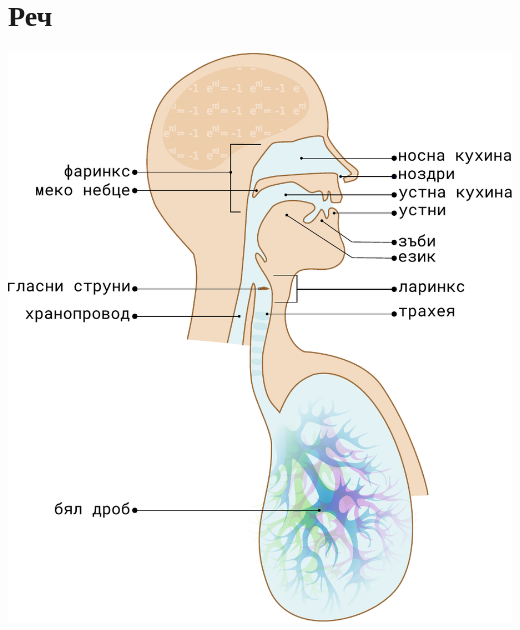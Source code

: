 \documentclass[9pt]{beamer}
\begin{document}
\section{Реч}
\begin{frame}[b]
    \includegraphics[width=0.48\paperwidth]{physics}%
    \hfill

\end{frame}
\end{document}
